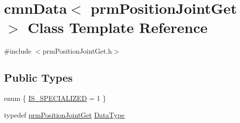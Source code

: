 \hypertarget{classcmn_data_3_01prm_position_joint_get_01_4}{}\section{cmn\+Data$<$ prm\+Position\+Joint\+Get $>$ Class Template Reference}
\label{classcmn_data_3_01prm_position_joint_get_01_4}


{\ttfamily \#include $<$prm\+Position\+Joint\+Get.\+h$>$}

\subsection*{Public Types}
\begin{DoxyCompactItemize}
\item 
enum \{ \hyperlink{classcmn_data_3_01prm_position_joint_get_01_4_a30ba42b0f7d5080bd6ba023d8e3683b6a37a4f8b02ddb6a50af0983a7f4a813b1}{I\+S\+\_\+\+S\+P\+E\+C\+I\+A\+L\+I\+Z\+E\+D} = 1
 \}
\item 
typedef \hyperlink{classprm_position_joint_get}{prm\+Position\+Joint\+Get} \hyperlink{classcmn_data_3_01prm_position_joint_get_01_4_ade75e8432e51840dc4c2aa616544c2b6}{Data\+Type}
\end{DoxyCompactItemize}
